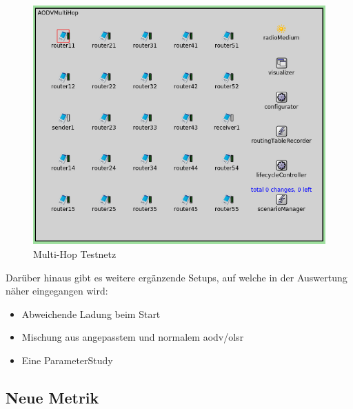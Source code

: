 \begin{figure}
  \centering
  \includegraphics[scale=0.35]{bilder/aodv2.png}
  \caption{Multi-Hop Testnetz}
  \label{image:omnet:aodv2}
\end{figure}

Darüber hinaus gibt es weitere ergänzende Setups, auf welche in der Auswertung näher eingegangen wird: 

\begin{itemize}
\item Abweichende Ladung beim Start
\item Mischung aus angepasstem und normalem \gls{aodv}/\gls{olsr}
\item Eine ParameterStudy
\end{itemize}

\subsection{Neue Metrik}
\label{chapter:versuch:aufbau:metrik}

